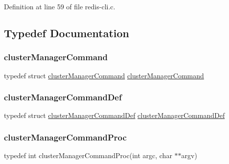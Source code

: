 Definition at line 59 of file redis-\/cli.\+c.



\subsection{Typedef Documentation}
\mbox{\label{redis-cli_8c_a4a287731949d49a0194c4ba6bf5d7523}} 
\subsubsection{\texorpdfstring{cluster\+Manager\+Command}{clusterManagerCommand}}
{\footnotesize\ttfamily typedef struct \hyperlink{structcluster_manager_command}{cluster\+Manager\+Command}  \hyperlink{structcluster_manager_command}{cluster\+Manager\+Command}}

\mbox{\label{redis-cli_8c_a708569b560d5de7d6b6f472cb70e41b5}} 
\subsubsection{\texorpdfstring{cluster\+Manager\+Command\+Def}{clusterManagerCommandDef}}
{\footnotesize\ttfamily typedef struct \hyperlink{structcluster_manager_command_def}{cluster\+Manager\+Command\+Def}  \hyperlink{structcluster_manager_command_def}{cluster\+Manager\+Command\+Def}}

\mbox{\label{redis-cli_8c_a8e9cfad74d28bc05c1e55864714a460f}} 
\subsubsection{\texorpdfstring{cluster\+Manager\+Command\+Proc}{clusterManagerCommandProc}}
{\footnotesize\ttfamily typedef int cluster\+Manager\+Command\+Proc(int argc, char $\ast$$\ast$argv)}



